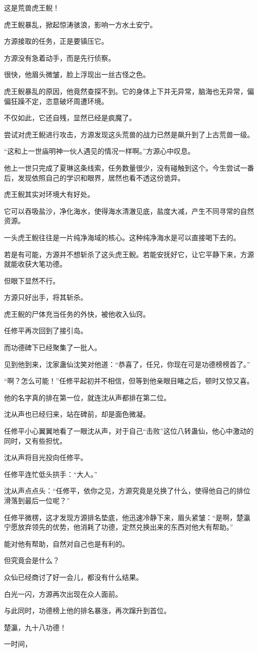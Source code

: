 \begin{this_body}
这是荒兽虎王鲵！

虎王鲵暴乱，掀起惊涛骇浪，影响一方水土安宁。

方源接取的任务，正是要镇压它。

方源没有急着动手，而是先行侦察。

很快，他眉头微皱，脸上浮现出一丝古怪之色。

虎王鲵暴乱的原因，他竟然查探不到。它的身体上下并无异常，脑海也无异常，偏偏狂躁不定，恣意破坏周遭环境。

不仅如此，它还自残，显然已经是疯魔了。

尝试对虎王鲵进行攻击，方源发现这头荒兽的战力已然是飙升到了上古荒兽一级。

“这和上一世庙明神一伙人遇见的情况一样啊。”方源心中叹息。

他上一世只完成了夏琳这条线索，任务数量很少，没有碰触到这个。今生尝试一番后，发现依照自己的学识和眼界，居然也看不透这份诡异。

虎王鲵其实对环境大有好处。

它可以吞吸盐沙，净化海水，使得海水清澈见底，盐度大减，产生不同寻常的自然资源。

一头虎王鲵往往是一片纯净海域的核心。这种纯净海水是可以直接喝下去的。

若是有可能，方源并不想斩杀了这头虎王鲵。若能安抚好它，让它平静下来，方源就能收获大笔功德。

但眼下显然不行。

方源只好出手，将其斩杀。

虎王鲵的尸体充当任务的外快，被他收入仙窍。

任修平再次回到了接引岛。

而功德碑下已经聚集了一批人。

见到他到来，沈家蛊仙沈笑对他道：“恭喜了，任兄，你现在可是功德榜榜首了。”

“啊？怎么可能！”任修平起初并不相信，但等到他亲眼目睹之后，顿时又惊又喜。

他的名字真的排在第一位，就连沈从声都排在第二位。

沈从声也已经归来，站在碑前，却是面色微凝。

任修平小心翼翼地看了一眼沈从声，对于自己“击败”这位八转蛊仙，他心中激动的同时，又有些担忧。

沈从声将目光投向任修平。

任修平连忙低头拱手：“大人。”

沈从声点点头：“任修平，依你之见，方源究竟是兑换了什么，使得他自己的排位滑落到最后一位呢？”

任修平微楞，这才发现方源排名垫底，他迅速冷静下来，眉头紧皱：“是啊，楚瀛宁愿放弃领先的优势，他消耗了功德，定然兑换出来的东西对他大有帮助。”

能对他有帮助，自然对自己也是有利的。

但究竟会是什么？

众仙已经商讨了好一会儿，都没有什么结果。

白光一闪，方源再次出现在众人面前。

与此同时，功德榜上他的排名暴涨，再次蹿升到首位。

楚瀛，九十八功德！

一时间，

\end{this_body}

